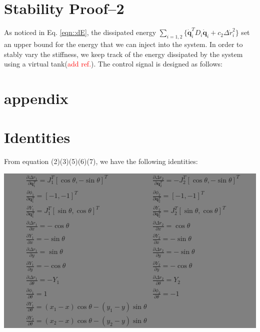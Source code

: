 \documentclass[]{article}
\begin{document}
\section{Stability Proof--2}
As noticed in Eq. \ref{eqn::dE}, the dissipated energy $\sum\limits_{i=1,2}\{\mathbf{\dot{q}}_i^TD_i\mathbf{\dot{q}}_i+c_2\Delta \dot{r}_i^2\}$ set an upper bound for the energy that we can inject into the system. In order to stably vary the stiffness, we keep track of the energy dissipated by the system using a virtual tank(\textcolor{red}{add ref.}). The control signal is designed as follows:

 

\section{appendix}
\appendix
\section{Identities}
\label{sec::app1}
From equation (2)(3)(5)(6)(7), we have the following identities:

\colorbox{gray}{
\begin{minipage}{10cm}
 \begin{align*}
 &\frac{\partial \Delta r_1}{\partial \mathbf{q}_1^T}=J_{1}^T\left[\cos\theta,-\sin\theta\right]^T 
 &\frac{\partial \Delta r_2}{\partial \mathbf{q}_2^T}=-J_{2}^T\left[\cos\theta,-\sin\theta\right]^T\nonumber\\
 &\frac{\partial \phi_1}{\partial \mathbf{q}_1^T}=[-1,-1]^T
 &\frac{\partial \phi_2}{\partial \mathbf{q}_2^T}=[-1,-1]^T\nonumber\\
 &\frac{\partial Y_1}{\partial\mathbf{q}_1^T}=J_1^T[\sin\theta,\cos\theta]^T
 &\frac{\partial Y_2}{\partial \mathbf{q}_2^T}=J_2^T[\sin\theta,\cos\theta]^T\nonumber\\
 &\frac{\partial \Delta r_1}{\partial x}=-\cos\theta
 &\frac{\partial \Delta r_2}{\partial x}=\cos\theta \nonumber\\
 &\frac{\partial Y_1}{\partial x}=-\sin\theta 
 &\frac{\partial Y_2}{\partial x}=-\sin\theta \nonumber\\
 &\frac{\partial \Delta r_1}{\partial y}=\sin\theta&\frac{\partial \Delta r_2}{\partial y}=-\sin\theta \nonumber\\
  &\frac{\partial Y_1}{\partial y}=-\cos\theta &\frac{\partial Y_2}{\partial y}=-\cos\theta \nonumber\\
  &\frac{\partial \Delta r_1}{\partial \theta}=-Y_1&\frac{\partial \Delta r_2}{\partial \theta}=Y_2\nonumber\\
  &\frac{\partial \phi_1}{\partial \theta}=1&\frac{\partial \phi_2}{\partial \theta}=-1\nonumber\\
  &\frac{\partial Y_1}{\partial \theta}=(x_1-x)\cos\theta-(y_1-y)\sin\theta&\\
  &\frac{\partial Y_2}{\partial \theta}=(x_2-x)\cos\theta-(y_2-y)\sin\theta&\nonumber
 \end{align*}
\end{minipage}}
\end{document}
